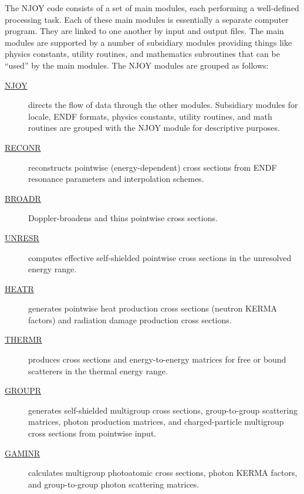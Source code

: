 The NJOY code consists of a set of main modules, each performing a
well-defined processing task.  Each of these main modules is
essentially a separate computer program.  They are linked to one
another by input and output files.  The main modules are supported
by a number of subsidiary modules providing things like physics
constants, utility routines, and mathematics subroutines that can
be ``used'' by the main modules.  The NJOY modules are grouped as
follows:
\begin{singlespace}
\begin{description}
\item[\hyperlink{sNJOYhy}{NJOY}] directs the flow of data through
the other modules.
  Subsidiary modules for locale, ENDF formats, physics constants,
  utility routines, and math routines are grouped with the NJOY
  module for descriptive purposes.

\item[\hyperlink{sRECONRhy}{RECONR}] reconstructs pointwise (energy-dependent)
  cross sections from ENDF resonance parameters and interpolation schemes.

\item[\hyperlink{sBROADRhy}{BROADR}] Doppler-broadens and thins pointwise
 cross sections.

\item[\hyperlink{sUNRESRhy}{UNRESR}] computes effective self-shielded pointwise
  cross sections in the unresolved energy range.

\item[\hyperlink{sHEATRhy}{HEATR}] generates pointwise heat production cross
 sections (neutron KERMA factors) and radiation damage production cross
 sections.

\item[\hyperlink{sTHERMRhy}{THERMR}] produces cross sections and
 energy-to-energy matrices for free or bound scatterers in the thermal
 energy range.

\item[\hyperlink{sGROUPRhy}{GROUPR}] generates self-shielded multigroup cross
  sections, group-to-group scattering matrices, photon production matrices,
  and charged-particle multigroup cross sections from pointwise input.

\item[\hyperlink{sGAMINRhy}{GAMINR}] calculates multigroup photoatomic cross
 sections, photon KERMA factors, and group-to-group photon scattering matrices.


\end{description}
\end{singlespace}
